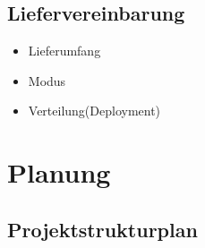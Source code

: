 \subsection{Liefervereinbarung}
\begin{itemize}
	\item Lieferumfang
	\item Modus
	\item Verteilung(Deployment)
\end{itemize}
\section{Planung}
\subsection{Projektstrukturplan}
\def \currentAuthor{Florian Tipotsch}
\newpage
